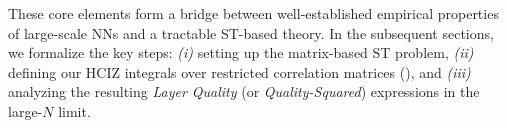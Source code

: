 \vspace*{1em}

These core elements form a bridge between well-established empirical properties of large-scale NNs 
and a tractable ST-based theory. In the subsequent sections, we formalize the key steps: 
\emph{(i)} setting up the matrix-based ST problem, \emph{(ii)} defining our HCIZ integrals 
over restricted correlation matrices (\ECS), and \emph{(iii)} analyzing the resulting 
\emph{Layer Quality} (or \emph{Quality-Squared}) expressions in the large-$N$ limit.

